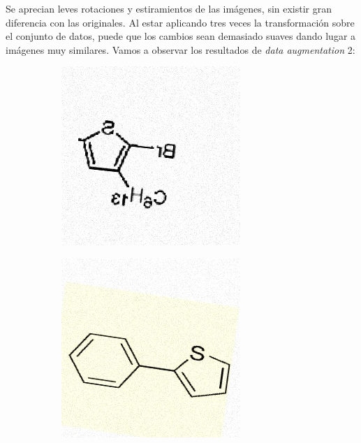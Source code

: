 Se aprecian leves rotaciones y estiramientos de las imágenes, sin existir gran diferencia con las originales. Al estar aplicando tres veces la transformación sobre el conjunto de datos, puede que los cambios sean demasiado suaves dando lugar a imágenes muy similares.  Vamos a observar los resultados de \textit{data augmentation} 2:

\begin{figure}[H]
\centering
    \begin{subfigure}{.26\textwidth}
        \centering
        \includegraphics[width=1\linewidth]{imagenes/aug2/169.jpg}
    \end{subfigure}%
    \begin{subfigure}{.26\textwidth}
        \centering
        \includegraphics[width=1\linewidth]{imagenes/aug2/188.jpg}
    \end{subfigure}%


\end{figure}
